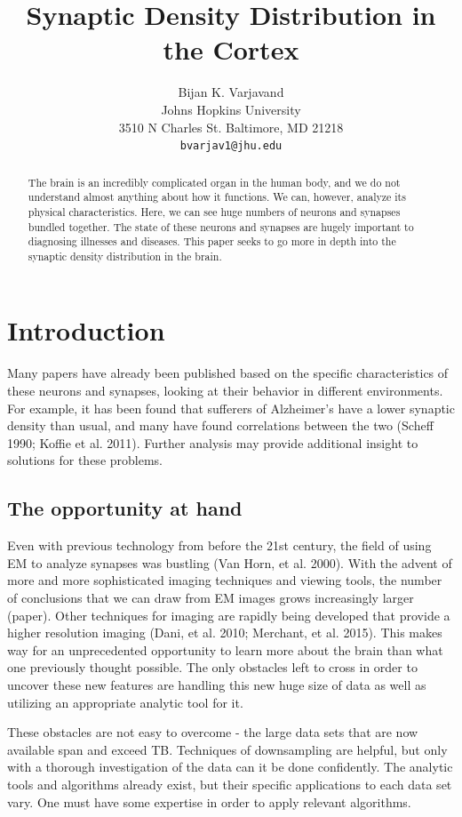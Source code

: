 \documentclass{article}
\title{Synaptic Density Distribution in the Cortex}
\author{
  Bijan K. Varjavand\\
  Johns Hopkins University\\
  3510 N Charles St. Baltimore, MD 21218 \\
  \texttt{bvarjav1@jhu.edu} \\
}
\begin{document}
\maketitle

\begin{abstract}
  The brain is an incredibly complicated organ in the human body, 
  and we do not understand almost anything about how it functions. 
  We can, however, analyze its physical characteristics. Here, we 
  can see huge numbers of neurons and synapses bundled together. 
  The state of these neurons and synapses are hugely important to 
  diagnosing illnesses and diseases. This paper seeks to go more 
  in depth into the synaptic density distribution in the brain.
\end{abstract}

\section{Introduction}

Many papers have already been published based on the specific characteristics of these neurons and synapses, looking at their behavior in different environments. For example, it has been found that sufferers of Alzheimer's have a lower synaptic density than usual, and many have found correlations between the two (Scheff 1990; Koffie et al. 2011). Further analysis may provide additional insight to solutions for these problems.

\subsection{The opportunity at hand}

Even with previous technology from before the 21st century, the field of using EM to analyze synapses was bustling (Van Horn, et al. 2000). With the advent of more and more sophisticated imaging techniques and viewing tools, the number of conclusions that we can draw from EM images grows increasingly larger (paper). Other techniques for imaging are rapidly being developed that provide a higher resolution imaging (Dani, et al. 2010; Merchant, et al. 2015). This makes way for an unprecedented opportunity to learn more about the brain than what one previously thought possible. The only obstacles left to cross in order to uncover these new features are handling this new huge size of data as well as utilizing an appropriate analytic tool for it.

These obstacles are not easy to overcome - the large data sets that are now available span and exceed TB. Techniques of downsampling are helpful, but only with a thorough investigation of the data can it be done confidently. The analytic tools and algorithms already exist, but their specific applications to each data set vary. One must have some expertise in order to apply relevant algorithms.
\end{document}
